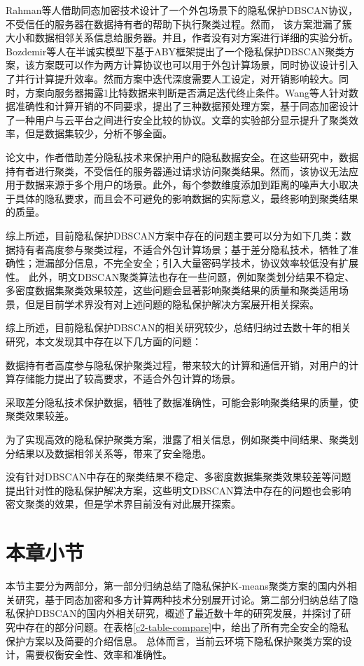 Rahman等人\cite{rahman2017towards}借助同态加密技术设计了一个外包场景下的隐私保护DBSCAN协议，不受信任的服务器在数据持有者的帮助下执行聚类过程。然而， 该方案泄漏了簇大小和数据相邻关系信息给服务器。并且，作者没有对方案进行详细的实验分析。Bozdemir等人\cite{2021Privacy}在半诚实模型下基于ABY框架\cite{2015ABY}提出了一个隐私保护DBSCAN聚类方案，该方案既可以作为两方计算协议也可以用于外包计算场景，同时协议设计引入了并行计算提升效率。然而方案中迭代深度需要人工设定，对开销影响较大。同时，方案向服务器揭露1比特数据来判断是否满足迭代终止条件。Wang等人\cite{wang2022homomorphic}针对数据准确性和计算开销的不同要求，提出了三种数据预处理方案，基于同态加密设计了一种用户与云平台之间进行安全比较的协议。文章的实验部分显示提升了聚类效率，但是数据集较少，分析不够全面。

论文\cite{2018DP,2015A}中，作者借助差分隐私技术来保护用户的隐私数据安全。在这些研究中，数据持有者进行聚类，不受信任的服务器通过请求访问聚类结果。然而，该协议无法应用于数据来源于多个用户的场景。此外，每个参数维度添加到距离的噪声大小取决于具体的隐私要求，而且会不可避免的影响数据的实际意义，最终影响到聚类结果的质量。

综上所述，目前隐私保护DBSCAN方案中存在的问题主要可以分为如下几类：数据持有者高度参与聚类过程，不适合外包计算场景；基于差分隐私技术，牺牲了准确性；泄漏部分信息，不完全安全；引入大量密码学技术，协议效率较低没有扩展性。
此外，明文DBSCAN聚类算法也存在一些问题，例如聚类划分结果不稳定、多密度数据集聚类效果较差，这些问题会显著影响聚类结果的质量和聚类适用场景，但是目前学术界没有对上述问题的隐私保护解决方案展开相关探索。

综上所述，目前隐私保护DBSCAN的相关研究较少，总结归纳过去数十年的相关研究，本文发现其中存在以下几方面的问题：
\begin{compactitem}
	\item 数据持有者高度参与隐私保护聚类过程，带来较大的计算和通信开销，对用户的计算存储能力提出了较高要求，不适合外包计算的场景。
	\item 采取差分隐私技术保护数据，牺牲了数据准确性，可能会影响聚类结果的质量，使聚类效果较差。
	\item 为了实现高效的隐私保护聚类方案，泄露了相关信息，例如聚类中间结果、聚类划分结果以及数据相邻关系等，带来了安全隐患。
	\item 没有针对DBSCAN中存在的聚类结果不稳定、多密度数据集聚类效果较差等问题提出针对性的隐私保护解决方案，这些明文DBSCAN算法中存在的问题也会影响密文聚类的效果，但是学术界目前没有对此展开探索。
\end{compactitem}

\section{本章小节}
本节主要分为两部分，第一部分归纳总结了隐私保护K-means聚类方案的国内外相关研究，基于同态加密和多方计算两种技术分别展开讨论。第二部分归纳总结了隐私保护DBSCAN的国内外相关研究，概述了最近数十年的研究发展，并探讨了研究中存在的部分问题。在表格\ref{c2-table-compare}中，给出了所有完全安全的隐私保护方案以及简要的介绍信息。
总体而言，当前云环境下隐私保护聚类方案的设计，需要权衡安全性、效率和准确性。

